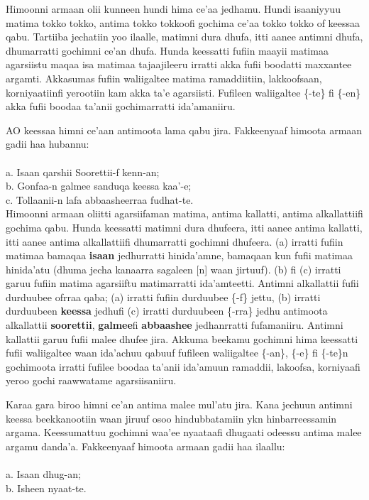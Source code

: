 \documentclass[11pt,b5paper]{book}
\begin{document}
Himoonni armaan olii kunneen hundi hima ce’aa jedhamu. Hundi isaaniyyuu matima tokko tokko, antima tokko tokkoofi gochima ce’aa tokko tokko of keessaa qabu. Tartiiba jechatiin yoo ilaalle, matimni dura dhufa, itti aanee antimni dhufa, dhumarratti gochimni ce’an dhufa. Hunda keessatti fufiin maayii matimaa agarsiistu maqaa isa matimaa tajaajileeru irratti akka fufii boodatti maxxantee argamti. Akkasumas fufiin waliigaltee matima ramaddiitiin, lakkoofsaan, korniyaatiinfi yerootiin kam akka ta’e agarsiisti. Fufileen waliigaltee \{-te\} fi \{-en\} akka fufii boodaa ta’anii gochimarratti ida’amaniiru. 


AO keessaa himni ce’aan antimoota lama qabu jira. Fakkeenyaaf himoota armaan gadii haa hubannu:\\
\\
a. Isaan qarshii Soorettii-f kenn-an; \\
b. Gonfaa-n galmee sanduqa keessa kaa’-e; \\
c. Tollaanii-n lafa abbaasheerraa fudhat-te.\\

Himoonni armaan oliitti agarsiifaman matima, antima kallatti, antima alkallattiifi gochima qabu. Hunda keessatti matimni dura dhufeera, itti aanee antima kallatti, itti aanee antima alkallattiifi dhumarratti gochimni dhufeera. (a) irratti fufiin matimaa bamaqaa \textbf{isaan} jedhurratti hinida’amne, bamaqaan kun fufii matimaa hinida’atu (dhuma jecha kanaarra sagaleen [n] waan jirtuuf). (b) fi (c) irratti garuu fufiin matima agarsiiftu matimarratti ida’amteetti. Antimni alkallattii fufii
durduubee ofrraa qaba; (a) irratti fufiin durduubee \{-f\} jettu, (b) irratti durduubeen \textbf{keessa} jedhufi (c) irratti durduubeen \{-rra\} jedhu antimoota alkallattii \textbf{soorettii}, \textbf{galmee}fi \textbf{abbaashee} jedhanrratti fufamaniiru. Antimni kallattii garuu fufii malee dhufee jira. Akkuma beekamu gochimni hima keessatti fufii waliigaltee waan ida’achuu qabuuf fufileen waliigaltee \{-an\}, \{-e\} fi \{-te\}n gochimoota irratti fufilee boodaa ta’anii ida’amuun ramaddii, lakoofsa, korniyaafi yeroo gochi raawwatame agarsiisaniiru.

Karaa gara biroo himni ce’an antima malee mul’atu jira. Kana jechuun antimni keessa beekkanootiin waan jiruuf osoo hindubbatamiin ykn hinbarreessamin argama. Keessumattuu gochimni waa’ee nyaataafi dhugaati odeessu antima malee argamu danda’a. Fakkeenyaaf himoota armaan gadii haa ilaallu:\\
\\
a. Isaan dhug-an; \\
b. Isheen nyaat-te.\\
\end{document}
